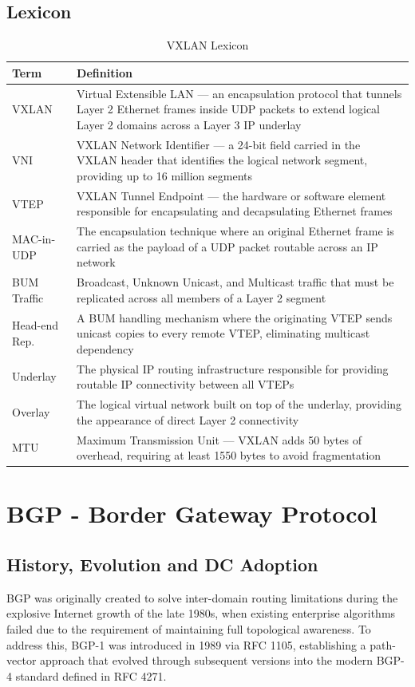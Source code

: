 \subsection{Lexicon}
\begin{table}[!htbp]
\small
\centering
\begin{tabularx}{\textwidth}{@{}l X@{}}
\toprule
\textbf{Term} & \textbf{Definition} \\ \midrule
VXLAN & Virtual Extensible LAN — an encapsulation protocol that tunnels Layer 2 Ethernet frames inside UDP packets to extend logical Layer 2 domains across a Layer 3 IP underlay  \\ \midrule
VNI & VXLAN Network Identifier — a 24-bit field carried in the VXLAN header that identifies the logical network segment, providing up to 16 million segments  \\ \midrule
VTEP & VXLAN Tunnel Endpoint — the hardware or software element responsible for encapsulating and decapsulating Ethernet frames  \\ \midrule
MAC-in-UDP & The encapsulation technique where an original Ethernet frame is carried as the payload of a UDP packet routable across an IP network \\ \midrule
BUM Traffic & Broadcast, Unknown Unicast, and Multicast traffic that must be replicated across all members of a Layer 2 segment \\ \midrule
Head-end Rep. & A BUM handling mechanism where the originating VTEP sends unicast copies to every remote VTEP, eliminating multicast dependency \\ \midrule
Underlay & The physical IP routing infrastructure responsible for providing routable IP connectivity between all VTEPs  \\ \midrule
Overlay & The logical virtual network built on top of the underlay, providing the appearance of direct Layer 2 connectivity  \\ \midrule
MTU & Maximum Transmission Unit — VXLAN adds 50 bytes of overhead, requiring at least 1550 bytes to avoid fragmentation \\ \bottomrule
\end{tabularx}
\caption{VXLAN Lexicon}
\label{tab:vxlan-lexicon}
\end{table}

\section{BGP - Border Gateway Protocol}
\subsection{History, Evolution and DC Adoption}
BGP was originally created to solve inter-domain routing limitations during the explosive Internet growth of the late 1980s, when existing enterprise algorithms failed due to the requirement of maintaining full topological awareness. To address this, BGP-1 was introduced in 1989 via RFC 1105, establishing a path-vector approach that evolved through subsequent versions into the modern BGP-4 standard defined in RFC 4271\cite{IETFRFC1105,IETFRFC4271}.

